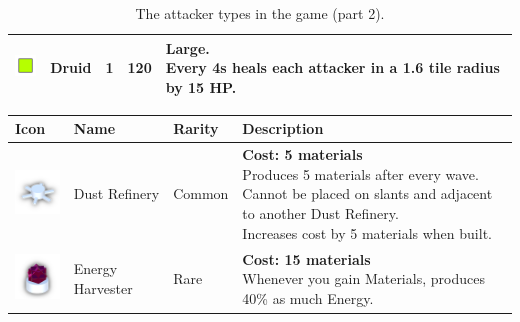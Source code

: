 \begin{table}[H]
\begin{tabular}{m{9mm}m{25mm}D{.}{.}{-1}rm{0.48\textwidth}}
        \includegraphics[height=7mm]{img/Icons/Attackers/Druid.png}         & \footnotesize{Druid}         & 1                   & 120              & \footnotesize{\textbf{Large.} \newline Every 4s heals each attacker in a 1.6 tile radius by 15 HP.}                                                         \\
        \bottomrule
    \end{tabular}
    \caption{The attacker types in the game (part 2).}
    \label{tab:attackers2}
\end{table}


\begin{table}[H]
    \centering
    \begin{tabular}{m{15mm}m{20mm}lm{}}
        \toprule
        \textbf{Icon}                                                            & \textbf{Name}           & \textbf{Rarity} & \textbf{Description}                                                                             \\
        \midrule
        \includegraphics[height=15mm]{img/Icons/Buildings/Dust Collector.png}    & Dust \newline Refinery  & Common          &
        \footnotesize{\textbf{Cost: 5 materials} \newline Produces 5 materials after every wave. \newline Cannot be placed on slants and adjacent to another Dust Refinery. \newline Increases cost by 5 materials when built.} \\

        \includegraphics[height=15mm]{img/Icons/Buildings/Energy Harvester.png}  & Energy Harvester        & Rare            &
        \footnotesize{\textbf{Cost: 15 materials} \newline Whenever you gain Materials, produces 40\% as much Energy.}                                                                                                          \\


\end{tabular}
\end{table}
